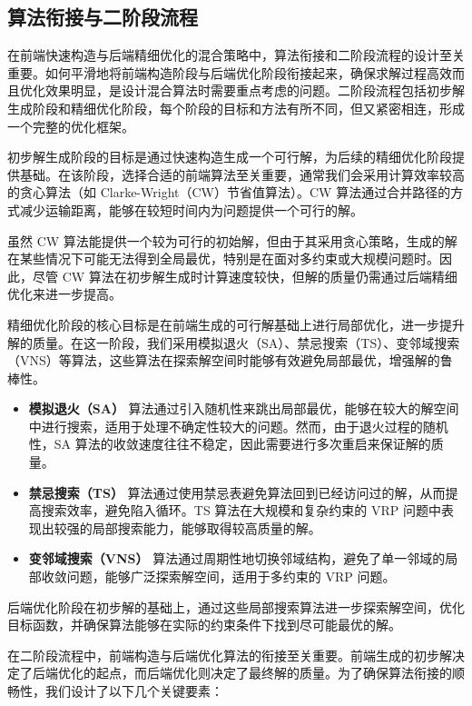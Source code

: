 \documentclass[12pt,a4paper,twoside]{ctexbook}
\begin{document}
\subsection{算法衔接与二阶段流程}

在前端快速构造与后端精细优化的混合策略中，算法衔接和二阶段流程的设计至关重要。如何平滑地将前端构造阶段与后端优化阶段衔接起来，确保求解过程高效而且优化效果明显，是设计混合算法时需要重点考虑的问题。二阶段流程包括初步解生成阶段和精细优化阶段，每个阶段的目标和方法有所不同，但又紧密相连，形成一个完整的优化框架。

初步解生成阶段的目标是通过快速构造生成一个可行解，为后续的精细优化阶段提供基础。在该阶段，选择合适的前端算法至关重要，通常我们会采用计算效率较高的贪心算法（如 Clarke-Wright（CW）节省值算法）。CW 算法通过合并路径的方式减少运输距离，能够在较短时间内为问题提供一个可行的解。

虽然 CW 算法能提供一个较为可行的初始解，但由于其采用贪心策略，生成的解在某些情况下可能无法得到全局最优，特别是在面对多约束或大规模问题时。因此，尽管 CW 算法在初步解生成时计算速度较快，但解的质量仍需通过后端精细优化来进一步提高。

精细优化阶段的核心目标是在前端生成的可行解基础上进行局部优化，进一步提升解的质量。在这一阶段，我们采用模拟退火（SA）、禁忌搜索（TS）、变邻域搜索（VNS）等算法，这些算法在探索解空间时能够有效避免局部最优，增强解的鲁棒性。

\begin{itemize}
    \item \textbf{模拟退火（SA）} 算法通过引入随机性来跳出局部最优，能够在较大的解空间中进行搜索，适用于处理不确定性较大的问题。然而，由于退火过程的随机性，SA 算法的收敛速度往往不稳定，因此需要进行多次重启来保证解的质量。
    \item \textbf{禁忌搜索（TS）} 算法通过使用禁忌表避免算法回到已经访问过的解，从而提高搜索效率，避免陷入循环。TS 算法在大规模和复杂约束的 VRP 问题中表现出较强的局部搜索能力，能够取得较高质量的解。
    \item \textbf{变邻域搜索（VNS）} 算法通过周期性地切换邻域结构，避免了单一邻域的局部收敛问题，能够广泛探索解空间，适用于多约束的 VRP 问题。
\end{itemize}

后端优化阶段在初步解的基础上，通过这些局部搜索算法进一步探索解空间，优化目标函数，并确保算法能够在实际的约束条件下找到尽可能最优的解。

在二阶段流程中，前端构造与后端优化算法的衔接至关重要。前端生成的初步解决定了后端优化的起点，而后端优化则决定了最终解的质量。为了确保算法衔接的顺畅性，我们设计了以下几个关键要素：
\end{document}
